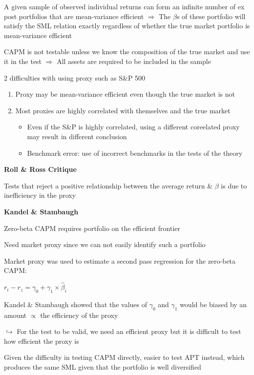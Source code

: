 \documentclass[]{book}
\theoremstyle{definition}
\theoremstyle{definition}
\theoremstyle{remark}
\begin{document}
A given sample of observed individual returns can form an infinite
number of ex post portfolios that are mean-variance efficient
\(\Rightarrow\) The \(\beta\)s of these portfolio will satisfy the SML
relation exactly regardless of whether the true market portfolio is
mean-variance efficient

CAPM is not testable unless we know the composition of the true market
and use it in the test \(\Rightarrow\) All assets are required to be
included in the sample

2 difficulties with using proxy such as S\&P 500

\begin{enumerate}
\def\labelenumi{\arabic{enumi})}
\item
  Proxy may be mean-variance efficient even though the true market is
  not
\item
  Most proxies are highly correlated with themselves and the true market

  \begin{itemize}
  \item
    Even if the S\&P is highly correlated, using a different coreelated
    proxy may result in different conclusion
  \item
    Benchmark error: use of incorrect benchmarks in the tests of the
    theory
  \end{itemize}
\end{enumerate}

\textbf{Roll \& Ross Critique}

Tests that reject a positive relationship between the average return \&
\(\beta\) is due to inefficiency in the proxy

\textbf{Kandel \& Stambaugh}

Zero-beta CAPM requires portfolio on the efficient frontier

Need market proxy since we can not easily identify such a portfolio

Market proxy was used to estimate a second pass regression for the
zero-beta CAPM:

\(r_i - r_z = \gamma_0 + \gamma_1 \times \hat{\beta}_i\)

Kandel \& Stambaugh showed that the values of \(\gamma_0\) and
\(\gamma_1\) would be biased by an amount \(\propto\) the efficiency of
the proxy

\(\hookrightarrow\) For the test to be valid, we need an efficient proxy
but it is difficult to test how efficient the proxy is

Given the difficulty in testing CAPM directly, easier to test APT
instead, which produces the same SML given that the portfolio is well
diversified
\end{document}
